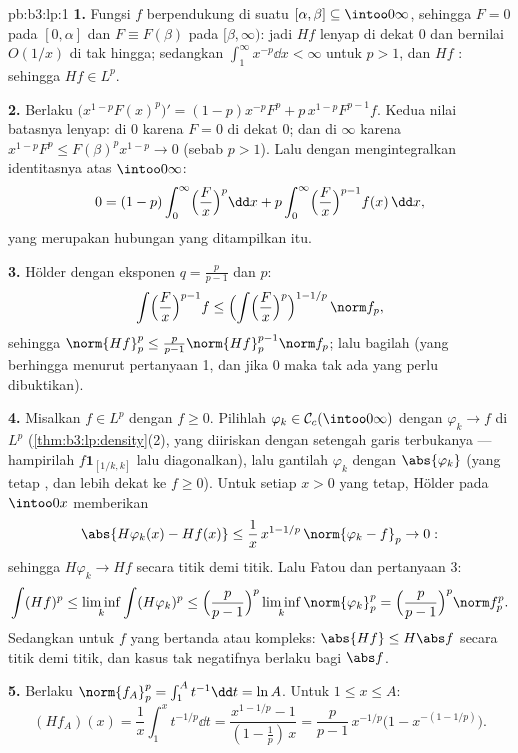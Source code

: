 \begin{solution}{pb:b3:lp:1}
\textbf{1.} Fungsi $f$ berpendukung di suatu $[\alpha, \beta]
\subseteq \intoo0\infty$, sehingga $F = 0$ pada $[0, \alpha]$ dan $F
\equiv F(\beta)$ pada $[\beta, \infty)$: jadi $Hf$ lenyap di dekat $0$
dan bernilai $O(1/x)$ di tak hingga; sedangkan $\int_1^\infty x^{-p}\dd x <
\infty$ untuk $p > 1$, dan $Hf$ : sehingga $Hf \in L^p$.

\textbf{2.} Berlaku $\bigl(x^{1-p}F(x)^p\bigr)' = (1-p)x^{-p}F^p +
p\,x^{1-p}F^{p-1}f$. Kedua nilai batasnya lenyap: di $0$
karena $F = 0$ di dekat $0$; dan di $\infty$ karena $x^{1-p}F^p \leq
F(\beta)^p x^{1-p} \to 0$ (sebab $p > 1$). Lalu dengan mengintegralkan identitasnya
atas $\intoo0\infty$:
\[
0 = (1 - p)\int_0^\infty\Bigl(\frac Fx\Bigr)^p\dd x
+ p\int_0^\infty\Bigl(\frac Fx\Bigr)^{p-1}f(x)\,\dd x,
\]
yang merupakan hubungan yang ditampilkan itu.

\textbf{3.} Hölder dengan eksponen $q = \frac p{p-1}$ dan $p$:
\[
\int\Bigl(\frac Fx\Bigr)^{p-1}f
\leq \Bigl(\int\Bigl(\frac
Fx\Bigr)^{p}\Bigr)^{1 - 1/p}\,\norm f_p ,
\]
sehingga $\norm{Hf}_p^p \leq \frac p{p-1}\norm{Hf}_p^{p-1}\norm
f_p$; lalu bagilah (yang berhingga menurut pertanyaan 1, dan jika $0$ maka tak ada
yang perlu dibuktikan).

\textbf{4.} Misalkan $f \in L^p$ dengan $f \geq 0$. Pilihlah $\varphi_k \in
\mathcal C_c(\intoo0\infty)$ dengan $\varphi_k \to f$ di $L^p$
(\cref{thm:b3:lp:density}(2), yang diiriskan dengan setengah garis
terbukanya --- hampirilah $f\mathbf 1_{[1/k, k]}$ lalu
diagonalkan), lalu gantilah $\varphi_k$ dengan $\abs{\varphi_k}$
(yang tetap , dan lebih dekat ke $f \geq 0$). Untuk setiap
$x > 0$ yang tetap, Hölder pada $\intoo0x$ memberikan
\[
\abs{H\varphi_k(x) - Hf(x)} \leq
\frac1x\,x^{1 - 1/p}\,\norm{\varphi_k - f}_p \to 0 :
\]
sehingga $H\varphi_k \to Hf$ secara titik demi titik. Lalu Fatou dan pertanyaan 3:
\[
\int (Hf)^p \leq \liminf_k\int(H\varphi_k)^p
\leq \Bigl(\frac p{p-1}\Bigr)^p\liminf_k\norm{\varphi_k}_p^p
= \Bigl(\frac p{p-1}\Bigr)^p\norm f_p^p .
\]
Sedangkan untuk $f$ yang bertanda atau kompleks: $\abs{Hf} \leq H\abs f$ secara titik demi titik,
dan kasus tak negatifnya berlaku bagi $\abs f$.

\textbf{5.} Berlaku $\norm{f_A}_p^p = \int_1^A t^{-1}\dd t = \ln A$.
Untuk $1 \leq x \leq A$:
\[
(Hf_A)(x) = \frac1x\int_1^x t^{-1/p}\dd t
= \frac{x^{1 - 1/p} - 1}{(1 - \tfrac1p)\,x}
= \frac p{p-1}\,x^{-1/p}\bigl(1 - x^{-(1 - 1/p)}\bigr).
\]


\end{solution}
